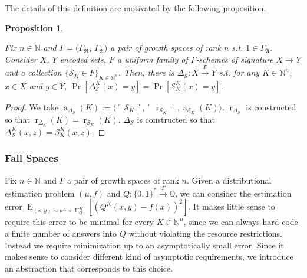 \documentclass{article}
\numberwithin{equation}{section}
\theoremstyle{definition}
\theoremstyle{plain}
\newtheorem{proposition}{Proposition}[section]
\newcommand{\Bool}{\{0,1\}}
\newcommand{\Words}{{\Bool^*}}
\DeclareMathOperator{\E}{E}
\DeclareMathOperator{\R}{r}
\DeclareMathOperator{\A}{a}
\DeclareMathOperator{\Un}{U}
\newcommand{\Nats}{\mathbb{N}}
\newcommand{\Rats}{\mathbb{Q}}
\newcommand{\Chev}[1]{\langle #1 \rangle}
\newcommand{\Quote}[1]{\ulcorner #1 \urcorner}
\newcommand{\GrowR}{\Gamma_{\mathfrak{R}}}
\newcommand{\GrowA}{\Gamma_{\mathfrak{A}}}
\newcommand{\Scheme}{\xrightarrow{\Gamma}}
\begin{document}
The details of this definition are motivated by the following proposition.

\begin{proposition}
\label{prp:fam_diag}

Fix $n \in \Nats$ and $\Gamma=(\GrowR$, $\GrowA)$ a pair of growth spaces of rank $n$ s.t. $1 \in \GrowA$. Consider $X$, $Y$ encoded sets, $F$ a uniform family of $\Gamma$-schemes of signature $X \rightarrow Y$ and a collection ${\{\mathcal{S}_K \in F\}_{K \in \Nats^n}}$. Then, there is $\Delta_\mathcal{S}: X \xrightarrow{
\Gamma} Y$ s.t. for any $K \in \Nats^n$, $x \in X$ and $y \in Y$, ${\Pr[\Delta_\mathcal{S}^K(x)=y] = \Pr[\mathcal{S}_K^K(x)=y]}$.

\end{proposition}

\begin{proof}

We take $\A_{\Delta_{\mathcal{S}}}(K):=\Chev{\Quote{\mathcal{S}_K},\Quote{\R_{\mathcal{S}_K}},\A_{\mathcal{S}_K}(K)}$. $\R_{\Delta_{\mathcal{S}}}$ is constructed so that ${\R_{\Delta_{\mathcal{S}}}(K)=\R_{\mathcal{S}_K}(K)}$. $\Delta_{\mathcal{S}}$ is constructed so that $\Delta_{\mathcal{S}}^K(x,z)=\mathcal{S}_K^K(x,z)$.
\end{proof}

\subsubsection{Fall Spaces}

Fix $n \in \Nats$ and $\Gamma$ a pair of growth spaces of rank $n$. Given a distributional estimation problem $(\mu,f)$ and $Q: \Words \Scheme \Rats$, we can consider the estimation error $\E_{(x,y) \sim \mu^{K} \times \Un_Q^K}[(Q^K(x,y) - f(x))^2]$. It makes little sense to require this error to be minimal for every $K \in \Nats^n$, since we can always hard-code a finite number of answers into $Q$ without violating the resource restrictions. Instead we require minimization up to an asymptotically small error. Since it makes sense to consider different kind of asymptotic requirements, we introduce an abstraction that corresponds to this choice.
\end{document}
